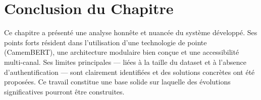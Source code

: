 \section*{Conclusion du Chapitre}

Ce chapitre a présenté une analyse honnête et nuancée du système développé.
Ses points forts résident dans l'utilisation d'une technologie de pointe
(CamemBERT), une architecture modulaire bien conçue et une accessibilité
multi-canal. Ses limites principales — liées à la taille du dataset et à
l'absence d'authentification — sont clairement identifiées et des solutions
concrètes ont été proposées. Ce travail constitue une base solide sur
laquelle des évolutions significatives pourront être construites.

\cleardoublepage
